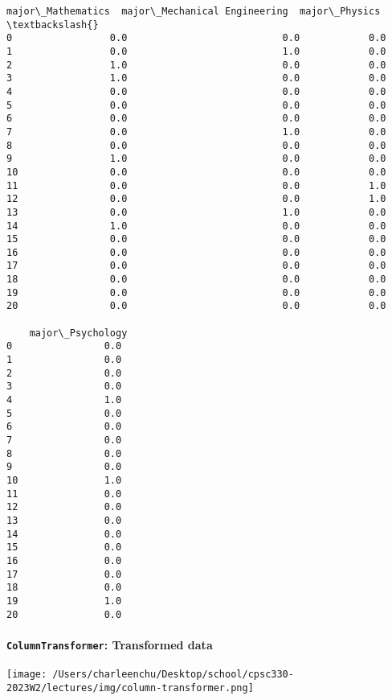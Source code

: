 \documentclass[11pt]{article}
\begin{document}
\begin{tcolorbox}[breakable, size=fbox, boxrule=.5pt, pad at break*=1mm, opacityfill=0]
\begin{Verbatim}[commandchars=\\\{\}]
    major\_Mathematics  major\_Mechanical Engineering  major\_Physics  \textbackslash{}
0                 0.0                           0.0            0.0
1                 0.0                           1.0            0.0
2                 1.0                           0.0            0.0
3                 1.0                           0.0            0.0
4                 0.0                           0.0            0.0
5                 0.0                           0.0            0.0
6                 0.0                           0.0            0.0
7                 0.0                           1.0            0.0
8                 0.0                           0.0            0.0
9                 1.0                           0.0            0.0
10                0.0                           0.0            0.0
11                0.0                           0.0            1.0
12                0.0                           0.0            1.0
13                0.0                           1.0            0.0
14                1.0                           0.0            0.0
15                0.0                           0.0            0.0
16                0.0                           0.0            0.0
17                0.0                           0.0            0.0
18                0.0                           0.0            0.0
19                0.0                           0.0            0.0
20                0.0                           0.0            0.0

    major\_Psychology
0                0.0
1                0.0
2                0.0
3                0.0
4                1.0
5                0.0
6                0.0
7                0.0
8                0.0
9                0.0
10               1.0
11               0.0
12               0.0
13               0.0
14               0.0
15               0.0
16               0.0
17               0.0
18               0.0
19               1.0
20               0.0
\end{Verbatim}
\end{tcolorbox}
        
    \paragraph{\texorpdfstring{\texttt{ColumnTransformer}: Transformed
data}{ColumnTransformer: Transformed data}}\label{columntransformer-transformed-data}

\texttt{[image: /Users/charleenchu/Desktop/school/cpsc330-2023W2/lectures/img/column-transformer.png]}
\end{document}
